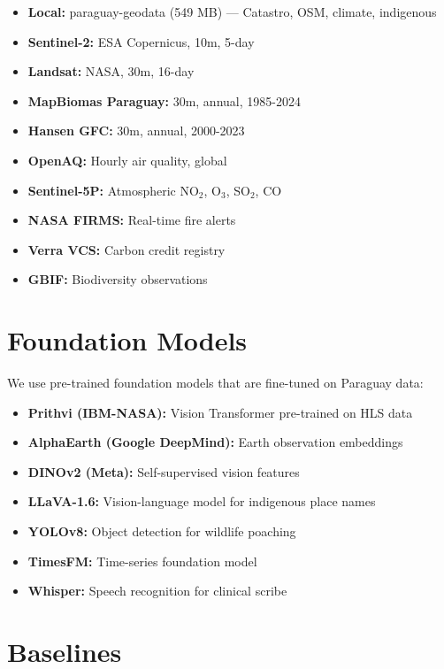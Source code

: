 \begin{itemize}
    \item \textbf{Local:} paraguay-geodata (549 MB) — Catastro, OSM, climate, indigenous
    \item \textbf{Sentinel-2:} ESA Copernicus, 10m, 5-day
    \item \textbf{Landsat:} NASA, 30m, 16-day
    \item \textbf{MapBiomas Paraguay:} 30m, annual, 1985-2024
    \item \textbf{Hansen GFC:} 30m, annual, 2000-2023
    \item \textbf{OpenAQ:} Hourly air quality, global
    \item \textbf{Sentinel-5P:} Atmospheric NO$_2$, O$_3$, SO$_2$, CO
    \item \textbf{NASA FIRMS:} Real-time fire alerts
    \item \textbf{Verra VCS:} Carbon credit registry
    \item \textbf{GBIF:} Biodiversity observations
\end{itemize}

\section{Foundation Models}

We use pre-trained foundation models that are fine-tuned on Paraguay data:

\begin{itemize}
    \item \textbf{Prithvi (IBM-NASA):} Vision Transformer pre-trained on HLS data \citep{jakubik2023foundation}
    \item \textbf{AlphaEarth (Google DeepMind):} Earth observation embeddings \citep{lamahewage2026alphaearth}
    \item \textbf{DINOv2 (Meta):} Self-supervised vision features \citep{oquab2024dinov2}
    \item \textbf{LLaVA-1.6:} Vision-language model for indigenous place names \citep{liu2024llavanext}
    \item \textbf{YOLOv8:} Object detection for wildlife poaching \citep{jocher2023yolov8}
    \item \textbf{TimesFM:} Time-series foundation model \citep{timesfm2024}
    \item \textbf{Whisper:} Speech recognition for clinical scribe \citep{whisper2022}
\end{itemize}

\section{Baselines}

